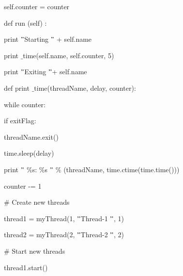 \documentclass[a4paper,12pt]{report}
\begin{document}
{\fontsize{9pt}{9pt}\selectfont self.counter = counter} \par
\noindent 
{\fontsize{9pt}{9pt}\selectfont def run (self) :} \par
\noindent 
{\fontsize{9pt}{9pt}\selectfont  \hspace*{0.5in} print  $ " $Starting  $ " $ + self.name} \par
\noindent 
{\fontsize{9pt}{9pt}\selectfont  \hspace*{0.5in} print $  \_  $time(self.name, self.counter, 5)} \par
\noindent 
{\fontsize{9pt}{9pt}\selectfont  \hspace*{0.5in} print  $ " $Exiting  $ " $+ self.name} \par
\vspace{9pt}
\noindent 
{\fontsize{9pt}{9pt}\selectfont def print $  \_  $time(threadName, delay, counter):} \par
\noindent 
{\fontsize{9pt}{9pt}\selectfont while counter:} \par
\noindent 
{\fontsize{9pt}{9pt}\selectfont  \hspace*{0.5in} if exitFlag:} \par
\noindent 
{\fontsize{9pt}{9pt}\selectfont  \hspace*{0.5in}  \hspace*{0.5in} threadName.exit()} \par
\noindent 
{\fontsize{9pt}{9pt}\selectfont  \hspace*{0.5in} time.sleep(delay)} \par
\noindent 
{\fontsize{9pt}{9pt}\selectfont  \hspace*{0.5in} print  $ " $ $  \%  $s:  $  \%  $s $ " $  $  \%  $ (threadName, time.ctime(time.time()))} \par
\noindent 
{\fontsize{9pt}{9pt}\selectfont counter -= 1} \par
\vspace{9pt}
\noindent 
{\fontsize{9pt}{9pt}\selectfont  $  \#  $ Create new threads} \par
\noindent 
{\fontsize{9pt}{9pt}\selectfont thread1 = myThread(1,  $ " $Thread-1 $ " $, 1)} \par
\noindent 
{\fontsize{9pt}{9pt}\selectfont thread2 = myThread(2,  $ " $Thread-2 $ " $, 2)} \par
\vspace{9pt}
\noindent 
{\fontsize{9pt}{9pt}\selectfont  $  \#  $ Start new threads} \par
\noindent 
{\fontsize{9pt}{9pt}\selectfont thread1.start()} \par
\end{document}
